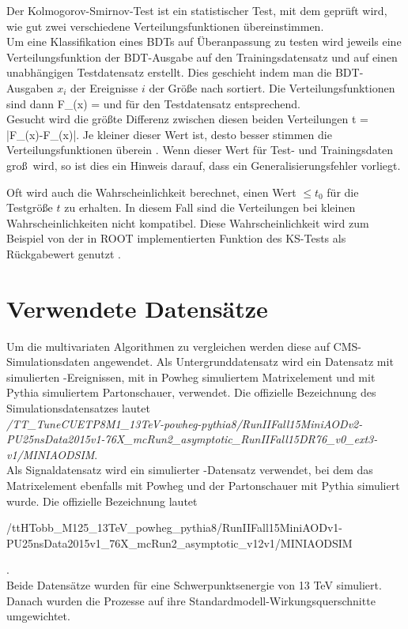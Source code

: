 Der Kolmogorov-Smirnov-Test ist ein statistischer Test, mit dem gepr\"uft wird, wie gut zwei verschiedene Verteilungsfunktionen \"ubereinstimmen.\\
Um eine Klassifikation eines BDTs auf \"Uberanpassung zu testen wird jeweils eine Verteilungsfunktion der BDT-Ausgabe auf den Trainingsdatensatz und auf einen unabh\"angigen Testdatensatz erstellt. Dies geschieht indem man die BDT-Ausgaben $x_i$ der Ereignisse $i$ der Gr\"o\ss e nach sortiert. Die Verteilungsfunktionen sind dann
\beq
F_{}(x) = 
\label{eq:CDF_train}
\eeq
und f\"ur den Testdatensatz entsprechend.\\
Gesucht wird die gr\"o\ss te Differenz zwischen diesen beiden Verteilungen
\beq
t = \cdot\max\left|F_{}(x)-F_{}(x)\right|.
\label{eq:KSTest}
\eeq
Je kleiner dieser Wert ist, desto besser stimmen die Verteilungsfunktionen \"uberein \cite{Blobel}. Wenn dieser Wert f\"ur Test- und Trainingsdaten gro\ss~wird, so ist dies ein Hinweis darauf, dass ein Generalisierungsfehler vorliegt.

Oft wird auch die Wahrscheinlichkeit berechnet, einen Wert $\leq t_0$ f\"ur die Testgr\"o\ss e $t$ zu erhalten. In diesem Fall sind die Verteilungen bei kleinen Wahrscheinlichkeiten nicht kompatibel. Diese Wahrscheinlichkeit wird zum Beispiel von der in ROOT implementierten Funktion des KS-Tests als R\"uckgabewert genutzt \cite{ROOT:TH1F}.

\section{Verwendete Datens\"atze}
\label{ch:Vergleich:sec:Daten}

Um die multivariaten Algorithmen zu vergleichen werden diese auf CMS-Simulationsdaten angewendet. Als Untergrunddatensatz wird ein Datensatz mit simulierten \ttb-Ereignissen, mit in Powheg \cite{Frixione:2007vw} simuliertem Matrixelement und mit Pythia \cite{Sjostrand2015159} simuliertem Partonschauer, verwendet. Die offizielle Bezeichnung des Simulationsdatensatzes lautet\\ {\it/TT\_TuneCUETP8M1\_13TeV-powheg-pythia8/RunIIFall15MiniAODv2-PU25nsData2015v1-76X\_mcRun2\_asymptotic\_RunIIFall15DR76\_v0\_ext3-v1/MINIAODSIM}.\\
Als Signaldatensatz wird ein simulierter \ttH-Datensatz verwendet, bei dem das Matrixelement ebenfalls mit Powheg und der Partonschauer mit Pythia simuliert wurde. Die offizielle Bezeichnung lautet  \begin{it}/ttHTobb\_M125\_13TeV\_powheg\_pythia8/RunIIFall15MiniAODv1-PU25nsData2015v1\_76X\_mcRun2\_asymptotic\_v12v1/MINIAODSIM\end{it}.\\
Beide Datens\"atze wurden f\"ur eine Schwerpunktsenergie von \num{13} \si{\tera\electronvolt} simuliert. Danach wurden die Prozesse auf ihre Standardmodell-Wirkungsquerschnitte umgewichtet.

